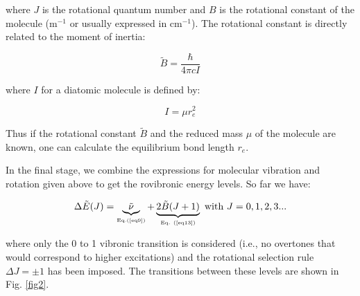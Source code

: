 \documentclass[byrevtex,amssymb,aps,pra,floatfix,letterpaper]{revtex4}
\begin{document}
\noindent
where $J$ is the rotational quantum number and $B$ is the rotational constant of the molecule (m$^{-1}$ or usually expressed in cm$^{-1}$). The rotational constant is directly related to the moment of inertia:

\begin{equation}
\tilde{B} = \frac{\hbar}{4\pi cI}
\label{eq14}
\end{equation}

\noindent
where $I$ for a diatomic molecule is defined by:

\begin{equation}
I = \mu r^2_e
\label{eq15}
\end{equation}

\noindent
Thus if the rotational constant $\tilde{B}$ and the reduced mass $\mu$ of the molecule are known, one can calculate the equilibrium bond length $r_e$.

In the final stage, we combine the expressions for molecular vibration and rotation given above to get the rovibronic energy levels. So far we have:

\begin{equation}
\Delta\tilde{E}(J) = \underbrace{\tilde{\nu}}_\textnormal{\tiny Eq.(\ref{eq9})} + \underbrace{2\tilde{B}(J + 1)}_\textnormal{\tiny Eq. (\ref{eq13})}\textnormal{ with }J=0,1,2,3...
\label{eq16}
\end{equation}

\noindent
where only the 0 to 1 vibronic transition is considered (i.e., no overtones that would correspond to higher excitations) and the rotational selection rule $\Delta J = \pm 1$ has been imposed. The transitions between these levels are shown in Fig. \ref{fig2}.
\end{document}
